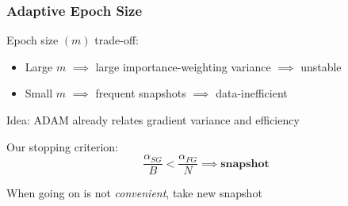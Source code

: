 \documentclass[aspectratio=169]{beamer}
\begin{document}
\begin{frame} 
\frametitle{Adaptive Epoch Size} 
Epoch size $(m)$ trade-off:
\begin{itemize}
	\item Large $m$ $\implies$ large importance-weighting variance $\implies$ unstable
	\item Small $m$ $\implies$ frequent snapshots $\implies$ data-inefficient
\end{itemize}
\vfill

Idea: ADAM already relates gradient variance and efficiency\\
\vfill

Our stopping criterion:
\begin{equation*}
\frac{\alpha_{SG}}{B} < \frac{\alpha_{FG}}{N} \implies \textbf{snapshot}
\end{equation*}
\vfill

When going on is not \textit{convenient}, take new snapshot
\end{frame}
\end{document}
